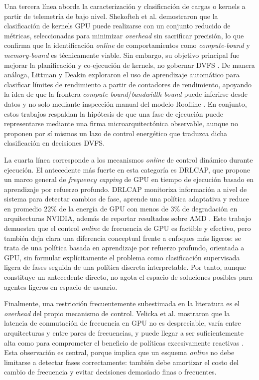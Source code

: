 \documentclass[12pt,oneside,spanish]{book}
\begin{document}
Una tercera línea aborda la caracterización y clasificación de cargas o kernels a partir de telemetría de bajo nivel. Shekofteh et al. demostraron que la clasificación de kernels GPU puede realizarse con un conjunto reducido de métricas, seleccionadas para minimizar \textit{overhead} sin sacrificar precisión, lo que confirma que la identificación \textit{online} de comportamientos como \textit{compute-bound} y \textit{memory-bound} es técnicamente viable. Sin embargo, su objetivo principal fue mejorar la planificación y co-ejecución de kernels, no gobernar DVFS \cite{Shekofteh2019}. De manera análoga, Littman y Deakin exploraron el uso de aprendizaje automático para clasificar límites de rendimiento a partir de contadores de rendimiento, apoyando la idea de que la frontera \textit{compute-bound}/\textit{bandwidth-bound} puede inferirse desde datos y no solo mediante inspección manual del modelo Roofline \cite{Littman2025}. En conjunto, estos trabajos respaldan la hipótesis de que una fase de ejecución puede representarse mediante una firma microarquitectónica observable, aunque no proponen por sí mismos un lazo de control energético que traduzca dicha clasificación en decisiones DVFS.

La cuarta línea corresponde a los mecanismos \textit{online} de control dinámico durante ejecución. El antecedente más fuerte en esta categoría es DRLCAP, que propone un marco general de \textit{frequency capping} de GPU en tiempo de ejecución basado en aprendizaje por refuerzo profundo. DRLCAP monitoriza información a nivel de sistema para detectar cambios de fase, aprende una política adaptativa y reduce en promedio 22\% de la energía de GPU con menos de 3\% de degradación en arquitecturas NVIDIA, además de reportar resultados sobre AMD \cite{Wang2024}. Este trabajo demuestra que el control \textit{online} de frecuencia de GPU es factible y efectivo, pero también deja clara una diferencia conceptual frente a enfoques más ligeros: se trata de una política basada en aprendizaje por refuerzo profundo, orientada a GPU, sin formular explícitamente el problema como clasificación supervisada ligera de fases seguida de una política discreta interpretable. Por tanto, aunque constituye un antecedente directo, no agota el espacio de soluciones posibles para agentes ligeros en espacio de usuario.

Finalmente, una restricción frecuentemente subestimada en la literatura es el \textit{overhead} del propio mecanismo de control. Velicka et al. mostraron que la latencia de conmutación de frecuencia en GPU no es despreciable, varía entre arquitecturas y entre pares de frecuencias, y puede llegar a ser suficientemente alta como para comprometer el beneficio de políticas excesivamente reactivas \cite{Velicka2025}. Esta observación es central, porque implica que un esquema \textit{online} no debe limitarse a detectar fases correctamente: también debe amortizar el costo del cambio de frecuencia y evitar decisiones demasiado finas o frecuentes.
\end{document}
